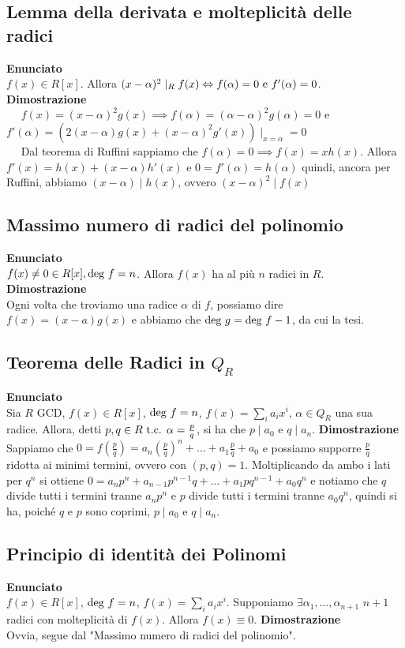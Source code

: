 \documentclass[a4paper,NoNotes,GeneralMath]{stdmdoc}
\newcommand{\Enunciato}{\vskip 0.05cm \noindent \textbf{Enunciato} \\ }
\renewcommand{\Dimostrazione}{\vskip 0.05cm \noindent \textbf{Dimostrazione} \\ }
\begin{document}
	\subsection{Lemma della derivata e molteplicità delle radici}
	\Enunciato $f(x) \in R[x]$. Allora $(x-\alpha)^2 \mid_R f(x) \Leftrightarrow f(\alpha) = 0 \text{ e } f'(\alpha) = 0$.
	\Dimostrazione \frdx $\quad$ $f(x) = (x-\alpha)^2g(x) \implies f(\alpha) = (\alpha-\alpha)^2g(\alpha) = 0$ e $f'(\alpha) = (2(x-\alpha)g(x) + (x-\alpha)^2 g'(x))\mid_{x = \alpha} = 0$ \\
		\frsx $\quad$ Dal teorema di Ruffini sappiamo che $f(\alpha) = 0 \implies f(x) = xh(x)$. Allora $f'(x) = h(x) + (x-\alpha) h'(x)$ e $0 = f'(\alpha) = h(\alpha)$ quindi, ancora per Ruffini, abbiamo $(x-\alpha) \mid h(x)$, ovvero $(x-\alpha)^2 \mid f(x)$

	\subsection{Massimo numero di radici del polinomio}
	\Enunciato $f(x) \neq 0 \in R[x], \mbox{deg } f = n$. Allora $f(x)$ ha al più $n$ radici in $R$.
	\Dimostrazione Ogni volta che troviamo una radice $\alpha$ di $f$, possiamo dire $f(x) = (x-a)g(x)$ e abbiamo che $\mbox{deg } g = \mbox{deg } f - 1$, da cui la tesi.

	\subsection{Teorema delle Radici in $Q_R$}
	\Enunciato Sia $R$ GCD, $f(x) \in R[x]$, $\mbox{deg } f = n$, $f(x) = \sum_i a_i x^i$, $\alpha \in Q_R$ una sua radice. Allora, detti $p, q \in R \mbox{ t.c. } \alpha = \frac{p}{q}$, si ha che $p \mid a_0$ e $q \mid a_n$.
	\Dimostrazione Sappiamo che $0 = f(\frac{p}{q}) = a_n (\frac{p}{q})^n + \ldots + a_1 \frac{p}{q} + a_0$ e possiamo supporre $\frac{p}{q}$ ridotta ai minimi termini, ovvero con $(p,q) = 1$. Moltiplicando da ambo i lati per $q^n$ si ottiene $0 = a_n p^n + a_{n-1} p^{n-1}q + \ldots + a_1 pq^{n-1} + a_0 q^n$ e notiamo che $q$ divide tutti i termini tranne $a_n p^n$ e $p$ divide tutti i termini tranne $a_0 q^n$, quindi si ha, poiché $q$ e $p$ sono coprimi, $p \mid a_0$ e $q \mid a_n$.

	\subsection{Principio di identità dei Polinomi}
	\Enunciato $f(x) \in R[x]$, $\mbox{deg } f = n$, $f(x) = \sum_i a_i x^i$. Supponiamo $\exists \alpha_1, \ldots, \alpha_{n+1}$ $n+1$ radici con molteplicità di $f(x)$. Allora $f(x) \equiv 0$.
	\Dimostrazione Ovvia, segue dal "Massimo numero di radici del polinomio".
\end{document}
